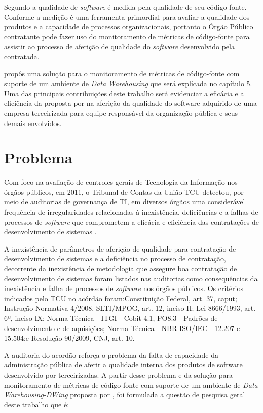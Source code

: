 Segundo \cite{beck1999}\cite{fowler1999refactoring} a qualidade de \textit{software} é medida pela qualidade de seu código-fonte. Conforme a \cite{ISO:15939} medição é uma ferramenta primordial para avaliar a qualidade dos produtos e a capacidade de processos organizacionais, portanto o Órgão Público contratante pode fazer uso do monitoramento de métricas de código-fonte para assistir ao processo de aferição de qualidade do \textit{software} desenvolvido pela contratada.

\cite{rego_monitoramento_2014} propôs uma solução para o monitoramento de métricas de código-fonte com suporte de um ambiente de \textit{Data Warehousing} que será explicada no capítulo 5. Uma das principais contribuições deste trabalho será evidenciar a eficácia e a eficiência da proposta por  na aferição da qualidade do software adquirido de uma empresa terceirizada para equipe responsável da organização pública e seus demais envolvidos.

\section{Problema}
\label{problema} 

Com foco na avaliação de controles gerais de Tecnologia da Informação nos órgãos públicos, em 2011, o Tribunal de Contas da União-TCU detectou, por meio de auditorias de governança de TI, em diversos órgãos uma considerável frequência de irregularidades relacionadas à inexistência, deficiências e a falhas de processos de \textit{software} que comprometem a eficácia e eficiência das contratações de desenvolvimento de sistemas \cite{Acordao381_2011}. 

A inexistência de parâmetros de aferição de qualidade para contratação de desenvolvimento de sistemas e a deficiência no processo de contratação, decorrente da inexistência de metodologia que assegure boa contratação de desenvolvimento de sistemas foram listados nas auditorias como consequências da inexistência e falha de processos de \textit{software} nos órgãos públicos. Os critérios indicados pelo TCU no acórdão \cite{Acordao381_2011} foram:Constituição Federal, art. 37, caput; Instrução Normativa 4/2008, SLTI/MPOG, art. 12, inciso II; Lei 8666/1993, art. 6º, inciso IX; Norma Técnica - ITGI - Cobit 4.1, PO8.3 - Padrões de desenvolvimento e de aquisições; Norma Técnica - NBR ISO/IEC - 12.207 e 15.504;e Resolução 90/2009, CNJ, art. 10. 

A auditoria do acordão \cite{Acordao381_2011} reforça o problema da falta de capacidade da administração pública de aferir a qualidade interna dos produtos de software desenvolvido por terceirizadas. A partir desse problema e da solução para monitoramento de métricas de código-fonte com suporte de um ambiente de \textit{Data Warehousing-DWing} proposta por  , foi formulada a questão de pesquisa geral deste trabalho que é:

